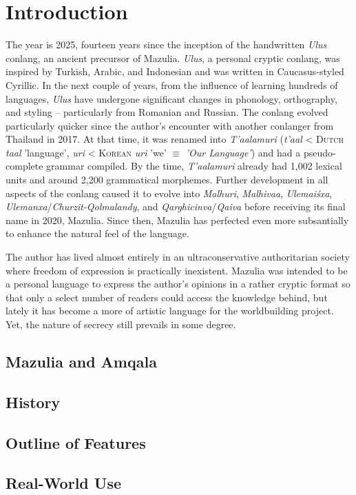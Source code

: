 \chapter{Introduction}

The year is 2025, fourteen years since the inception of the handwritten \textit{Ulus} conlang, an ancient precursor of Mazulia. \textit{Ulus}, a personal cryptic conlang, was inspired by Turkish, Arabic, and Indonesian and was written in Caucasus-styled Cyrillic. In the next couple of years, from the influence of learning hundreds of languages, \textit{Ulus} have undergone significant changes in phonology, orthography, and styling – particularly from Romanian and Russian. The conlang evolved particularly quicker since the author's encounter with another conlanger from Thailand in 2017. At that time, it was renamed into \textit{T'aalamuri} (\textit{t'aal} < \textsc{Dutch} \textit{taal} 'language', \textit{uri} < \textsc{Korean} \textit{uri} 'we' $\equiv$ \textit{'Our Language'}) and had a pseudo-complete grammar compiled. By the time, \textit{T'aalamuri} already had 1,002 lexical units and around 2,200 grammatical morphemes. Further development in all aspects of the conlang caused it to evolve into \textit{Malhuri}, \textit{Malhivaa}, \textit{Ulemaiśxa}, \textit{Ulemanxa}/\textit{Churzit-Qolmalandy}, and \textit{Qarghicinva}/\textit{Qaiva} before receiving its final name in 2020, Mazulia. Since then, Mazulia has perfected even more subsantially to enhance the natural feel of the language.

The author has lived almost entirely in an ultraconservative authoritarian society where freedom of expression is practically inexistent. Mazulia was intended to be a personal language to express the author's opinions in a rather cryptic format so that only a select number of readers could access the knowledge behind, but lately it has become a more of artistic language for the worldbuilding project. Yet, the nature of secrecy still prevails in some degree.

\section{Mazulia and Amqala}

\section{History}

\section{Outline of Features}

\section{Real-World Use}